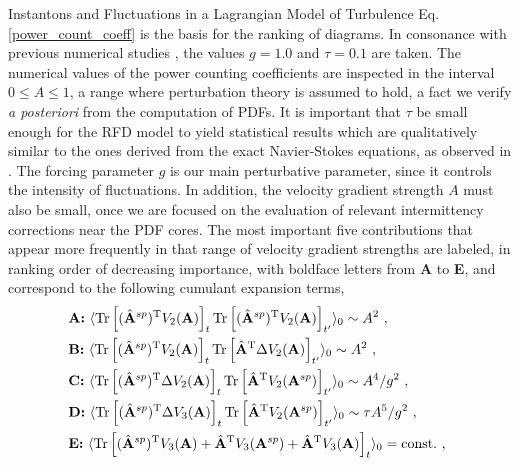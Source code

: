 \begin{chapter}{Instantons and Fluctuations in a Lagrangian Model of Turbulence}
Eq. \eqref{power_count_coeff} is the basis for the ranking of diagrams. In consonance with previous numerical studies \parencite{ChevPRL,moriconi2014,afonso2010recent,grigorio2017instantons}, the values $g=1.0$ and $\tau=0.1$ are taken.
The numerical values of the power counting coefficients are inspected in the interval $0 \leq A \leq 1$, a range where perturbation theory is assumed to hold, a fact we verify \textit{a posteriori} from the computation of PDFs.
It is important that $\tau$ be small enough for the RFD model to yield statistical results which are qualitatively similar to the ones derived from the exact Navier-Stokes equations, as observed in \textcite{ChevPRL}.
The forcing parameter $g$ is our main perturbative parameter, since it controls the intensity of fluctuations. In addition, the velocity gradient strength $A$ must also be small, once we are focused on the evaluation of relevant intermittency corrections near the PDF cores. 
The most important five contributions that appear more frequently in that range of velocity gradient strengths are labeled, in ranking order of decreasing importance, with boldface letters from {\textbf{A}} to {\textbf{E}}, and correspond to the following cumulant expansion terms,
\begin{align}
  &\textbf{A:}  \  \langle \mathrm{Tr} \left [ ( \hat {\mathbf{A}}^{sp})^\T V_2({\mathbf{A}}) \right ]_t  \mathrm{Tr} \left [ ( \hat {\mathbf{A}}^{sp})^\T V_2({\mathbf{A}}) \right ]_{t'}   \rangle_0  \sim A^2 \ , \ \label{eqA} \\ 
  &\textbf{B:} \ \langle \mathrm{Tr} \left [ ( \hat {\mathbf{A}}^{sp})^\T V_2({\mathbf{A}}) \right ]_t  \mathrm{Tr} \left [ \hat {\mathbf{A}}^\T \Delta V_2({\mathbf{A}}) \right ]_{t'} \rangle_0 \sim A^2 \ , \ \label{eqB} \\ 
  &\textbf{C:} \ \langle \mathrm{Tr} \left [ ( \hat {\mathbf{A}}^{sp})^\T \Delta V_2({\mathbf{A}}) \right ]_t  \mathrm{Tr} \left [ \hat {\mathbf{A}}^\T V_2({\mathbf{A}}^{sp}) \right ]_{t'} \rangle_0 \sim  A^4/g^2 \ , \ \\
  &\textbf{D:} \ \langle \mathrm{Tr} \left [ ( \hat {\mathbf{A}}^{sp})^\T \Delta V_3({\mathbf{A}}) \right ]_t \mathrm{Tr} \left [ \hat {\mathbf{A}}^\T V_2({\mathbf{A}}^{sp}) \right ]_{t'} \rangle_0 \sim  \tau A^5/g^2 \label{eqD} \ , \ \\
  &\textbf{E:} \ \langle \mathrm{Tr} \left [ ( \hat {\mathbf{A}}^{sp} )^\T V_3({\mathbf{A}}) +  \hat {\mathbf{A}}^\T V_3 ({\mathbf{A}}^{sp}) +  \hat {\mathbf{A}}^\T V_3({\mathbf{A}}) \right ]_t \rangle_0 = {\hbox{const.}}  \label{eqE} \ , \ 

\end{align}
\end{chapter}
